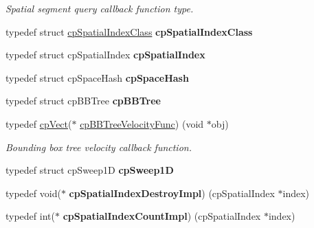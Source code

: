 \begin{DoxyCompactItemize}
\begin{DoxyCompactList}\small\item\em Spatial segment query callback function type. \end{DoxyCompactList}\item 
\hypertarget{group__cp_spatial_index_ga0e6be503abc1229a5da339a30ee6f88e}{}typedef struct \hyperlink{structcp_spatial_index_class}{cp\+Spatial\+Index\+Class} {\bfseries cp\+Spatial\+Index\+Class}\label{group__cp_spatial_index_ga0e6be503abc1229a5da339a30ee6f88e}

\item 
\hypertarget{group__cp_spatial_index_ga1af77c242def41e791d49350c809cc7f}{}typedef struct cp\+Spatial\+Index {\bfseries cp\+Spatial\+Index}\label{group__cp_spatial_index_ga1af77c242def41e791d49350c809cc7f}

\item 
\hypertarget{group__cp_spatial_index_ga3ff6ff3229f67d50c8a936fce831e047}{}typedef struct cp\+Space\+Hash {\bfseries cp\+Space\+Hash}\label{group__cp_spatial_index_ga3ff6ff3229f67d50c8a936fce831e047}

\item 
\hypertarget{group__cp_spatial_index_ga8347b442aab8cc34989d11220846260a}{}typedef struct cp\+B\+B\+Tree {\bfseries cp\+B\+B\+Tree}\label{group__cp_spatial_index_ga8347b442aab8cc34989d11220846260a}

\item 
typedef \hyperlink{structcp_vect}{cp\+Vect}($\ast$ \hyperlink{group__cp_spatial_index_ga5e805ddbe3cab9b92a6fbd933ff6e6b0}{cp\+B\+B\+Tree\+Velocity\+Func}) (void $\ast$obj)
\begin{DoxyCompactList}\small\item\em Bounding box tree velocity callback function. \end{DoxyCompactList}\item 
\hypertarget{group__cp_spatial_index_gad24eda1cd6772ea93a036c766b787c3b}{}typedef struct cp\+Sweep1\+D {\bfseries cp\+Sweep1\+D}\label{group__cp_spatial_index_gad24eda1cd6772ea93a036c766b787c3b}

\item 
\hypertarget{group__cp_spatial_index_gaaaf3c06d9176031f22ccd1f69a760ebb}{}typedef void($\ast$ {\bfseries cp\+Spatial\+Index\+Destroy\+Impl}) (cp\+Spatial\+Index $\ast$index)\label{group__cp_spatial_index_gaaaf3c06d9176031f22ccd1f69a760ebb}

\item 
\hypertarget{group__cp_spatial_index_gae98eded3b672a84bdae64ff61476d096}{}typedef int($\ast$ {\bfseries cp\+Spatial\+Index\+Count\+Impl}) (cp\+Spatial\+Index $\ast$index)\label{group__cp_spatial_index_gae98eded3b672a84bdae64ff61476d096}


\end{DoxyCompactItemize}
